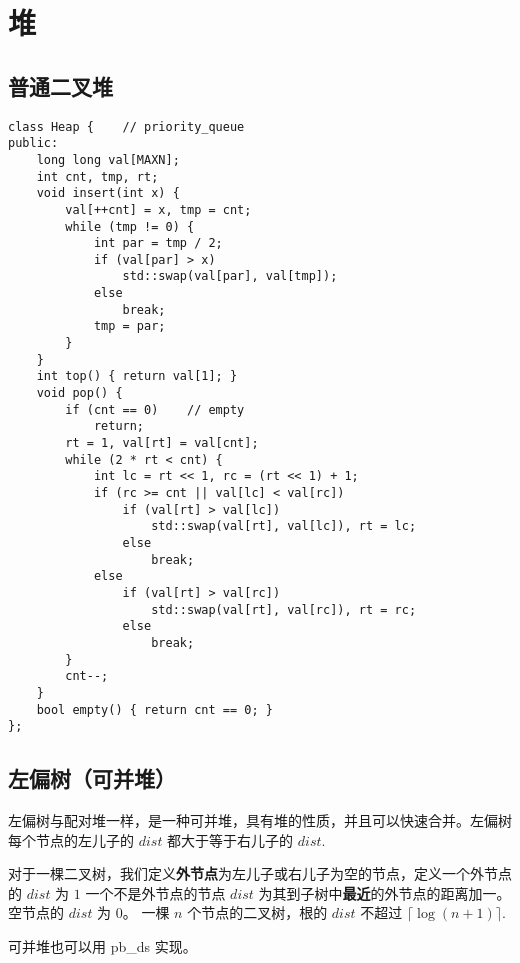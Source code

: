\section{堆}

\subsection{普通二叉堆}

\begin{verbatim}
class Heap {    // priority_queue
public:
    long long val[MAXN];
    int cnt, tmp, rt;
    void insert(int x) {
        val[++cnt] = x, tmp = cnt;
        while (tmp != 0) {
            int par = tmp / 2;
            if (val[par] > x)
                std::swap(val[par], val[tmp]);
            else
                break;
            tmp = par;
        }
    }
    int top() { return val[1]; }
    void pop() {
        if (cnt == 0)    // empty
            return;
        rt = 1, val[rt] = val[cnt];
        while (2 * rt < cnt) {
            int lc = rt << 1, rc = (rt << 1) + 1;
            if (rc >= cnt || val[lc] < val[rc])
                if (val[rt] > val[lc])
                    std::swap(val[rt], val[lc]), rt = lc;
                else
                    break;
            else
                if (val[rt] > val[rc])
                    std::swap(val[rt], val[rc]), rt = rc;
                else
                    break;
        }
        cnt--;
    }
    bool empty() { return cnt == 0; }
};    
\end{verbatim}

\subsection{左偏树（可并堆）}

\par \noindent 左偏树与配对堆一样，是一种可并堆，具有堆的性质，并且可以快速合并。左偏树每个节点的左儿子的 $dist$ 都大于等于右儿子的 $dist$.

\par \noindent 对于一棵二叉树，我们定义\textbf{外节点}为左儿子或右儿子为空的节点，定义一个外节点的 $dist$ 为 $1$ 
一个不是外节点的节点 $dist$ 为其到子树中\textbf{最近}的外节点的距离加一。空节点的 $dist$ 为 $0$。
一棵 $n$ 个节点的二叉树，根的 $dist$ 不超过 $\lceil \log (n+1) \rceil$.

\par \noindent 可并堆也可以用 pb\_ds 实现。

